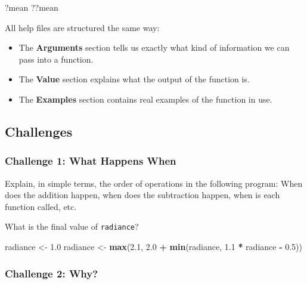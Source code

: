 \documentclass[]{book}
\newenvironment{Shaded}{\begin{snugshade}}{\end{snugshade}}
\newcommand{\KeywordTok}[1]{\textcolor[rgb]{0.13,0.29,0.53}{\textbf{#1}}}
\newcommand{\FloatTok}[1]{\textcolor[rgb]{0.00,0.00,0.81}{#1}}
\newcommand{\StringTok}[1]{\textcolor[rgb]{0.31,0.60,0.02}{#1}}
\newcommand{\OperatorTok}[1]{\textcolor[rgb]{0.81,0.36,0.00}{\textbf{#1}}}
\newcommand{\NormalTok}[1]{#1}
\providecommand{\tightlist}{%
  \setlength{\itemsep}{0pt}\setlength{\parskip}{0pt}}
\begin{document}
\begin{Shaded}
\begin{Highlighting}[]
\NormalTok{?mean}
\NormalTok{??mean}
\end{Highlighting}
\end{Shaded}

All help files are structured the same way:

\begin{itemize}
\tightlist
\item
  The \textbf{Arguments} section tells us exactly what kind of
  information we can pass into a function.
\item
  The \textbf{Value} section explains what the output of the function
  is.
\item
  The \textbf{Examples} section contains real examples of the function
  in use.
\end{itemize}

\subsection{Challenges}\label{challenges-2}

\subsubsection*{Challenge 1: What Happens
When}\label{challenge-1-what-happens-when}

Explain, in simple terms, the order of operations in the following
program: When does the addition happen, when does the subtraction
happen, when is each function called, etc.

What is the final value of \texttt{radiance}?

\begin{Shaded}
\begin{Highlighting}[]
\NormalTok{radiance <-}\StringTok{ }\FloatTok{1.0}
\NormalTok{radiance <-}\StringTok{ }\KeywordTok{max}\NormalTok{(}\FloatTok{2.1}\NormalTok{, }\FloatTok{2.0} \OperatorTok{+}\StringTok{ }\KeywordTok{min}\NormalTok{(radiance, }\FloatTok{1.1} \OperatorTok{*}\StringTok{ }\NormalTok{radiance }\OperatorTok{-}\StringTok{ }\FloatTok{0.5}\NormalTok{))}
\end{Highlighting}
\end{Shaded}

\subsubsection*{Challenge 2: Why?}\label{challenge-2-why}
\end{document}
